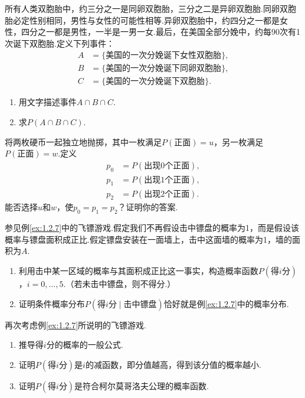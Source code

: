 \begin{exercise}\label{exercise:1.5}
所有人类双胞胎中，约三分之一是同卵双胞胎，三分之二是异卵双胞胎.同卵双胞胎必定性别相同，男性与女性的可能性相等.异卵双胞胎中，约四分之一都是女性，四分之一都是男性，一半是一男一女.最后，在美国全部分娩中，约每90次有1次诞下双胞胎.定义下列事件：
$$
\begin{aligned}
A&=\{\text{美国的一次分娩诞下女性双胞胎}\},\\
B&=\{\text{美国的一次分娩诞下同卵双胞胎}\},\\
C&=\{\text{美国的一次分娩诞下双胞胎}\}.
\end{aligned}
$$
\begin{enumerate}
\item[(a)] 用文字描述事件$A\cap B\cap C$.
\item[(b)] 求$P(A\cap B\cap C)$.
\end{enumerate}
\end{exercise}



\begin{exercise}\label{exercise:1.6}
将两枚硬币一起独立地抛掷，其中一枚满足$P(\text{正面})=u$，另一枚满足$P(\text{正面})=w$.定义
$$
\begin{aligned}
p_0&=P(\text{出现0个正面}),\\
p_1&=P(\text{出现1个正面}),\\
p_2&=P(\text{出现2个正面}).
\end{aligned}
$$
能否选择$u$和$w$，使$p_0=p_1=p_2$？证明你的答案.
\end{exercise}

\begin{exercise}\label{exercise:1.7}
参见例\ref{ex:1.2.7}中的飞镖游戏.假定我们不再假设击中镖盘的概率为1，而是假设该概率与镖盘面积成正比.假定镖盘安装在一面墙上，击中这面墙的概率为1，墙的面积为$A$.
\begin{enumerate}
\item[(a)] 利用击中某一区域的概率与其面积成正比这一事实，构造概率函数$P(\text{得}i\text{分})$，$i=0,\ldots,5$.（若未击中镖盘，则不得分.）
\item[(b)] 证明条件概率分布$P(\text{得}i\text{分}\mid\text{击中镖盘})$恰好就是例\ref{ex:1.2.7}中的概率分布.
\end{enumerate}
\end{exercise}

\begin{exercise}\label{exercise:1.8}
再次考虑例\ref{ex:1.2.7}所说明的飞镖游戏.
\begin{enumerate}
\item[(a)] 推导得$i$分的概率的一般公式.
\item[(b)] 证明$P(\text{得}i\text{分})$是$i$的减函数，即分值越高，得到该分值的概率越小.
\item[(c)] 证明$P(\text{得}i\text{分})$是符合柯尔莫哥洛夫公理的概率函数.
\end{enumerate}
\end{exercise}


